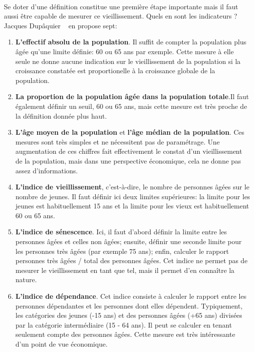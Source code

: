 \paragraph{}Se doter d’une définition constitue une première étape importante mais il faut aussi être capable de mesurer ce vieillissement. Quels en sont les indicateurs ? Jacques Dupâquier ~\citep[pp.10-11]{dupaquier} en propose sept: 
\begin{enumerate}
  \item \textbf{L’effectif absolu de la population}. Il suffit de compter la population plus âgée qu’une limite définie: 60 ou 65 ans par exemple. Cette mesure à elle seule ne donne aucune indication sur le vieillissement de la population si la croissance constatée est proportionelle à la croissance globale de la population.
  \item \textbf{La proportion de la population âgée dans la population totale}.Il faut également définir un seuil, 60 ou 65 ans, mais cette mesure est très proche de la définition donnée plus haut. 
  \item \textbf{L'âge moyen de la population} et \textbf{l’âge médian de la population}. Ces mesures sont très simples et ne nécessitent pas de paramétrage. Une augmentation de ces chiffres fait effectivement le constat d’un vieillissement de la population, mais dans une perspective économique, cela ne donne pas assez d’informations. 
  \item \textbf{L’indice de vieillissement}, c’est-à-dire, le nombre de personnes âgées sur le nombre de jeunes. Il faut définir ici deux limites supérieures: la limite pour les jeunes est habituellement 15 ans et la limite pour les vieux est habituellement 60 ou 65 ans.
  \item \textbf{L’indice de sénescence}. Ici, il faut d’abord définir la limite entre les personnes âgées et celles non âgées; ensuite, définir une seconde limite pour les personnes très âgées (par exemple 75 ans); enfin, calculer le rapport personnes très âgées / total des personnes âgées. Cet indice ne permet pas de mesurer le vieillissement en tant que tel, mais il permet d'en connaître la nature.
  \item \textbf{L’indice de dépendance}. Cet indice consiste à calculer le rapport entre les personnes dépendantes et les personnes dont elles dépendent. Typiquement, les catégories des jeunes (-15 ans) et des personnes âgées (+65 ans) divisées par la catégorie intermédiaire (15 - 64 ans). Il peut se calculer en tenant seulement compte des personnes âgées. Cette mesure est très intéressante d’un point de vue économique. 
\end{enumerate}
